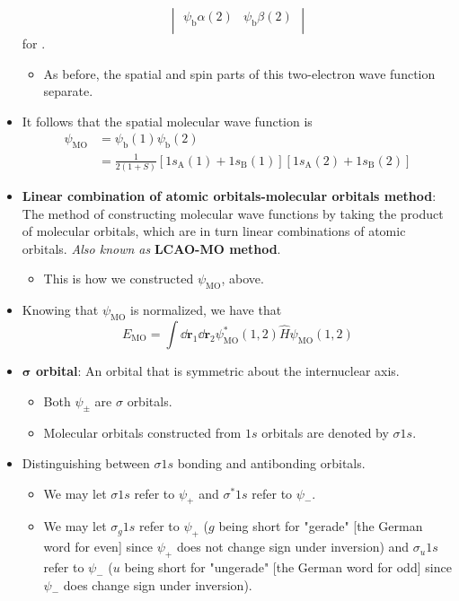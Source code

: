 \documentclass[../notes.tex]{subfiles}
\begin{document}
\begin{itemize}
\begin{equation*}
\begin{vmatrix}
            \psi_\text{b}\alpha(2) & \psi_\text{b}\beta(2)\\
        \end{vmatrix}
    \end{equation*}
    for .
    \begin{itemize}
        \item As before, the spatial and spin parts of this two-electron wave function separate.
    \end{itemize}
    \item It follows that the spatial molecular wave function is
    \begin{align*}
        \psi_\text{MO} &= \psi_\text{b}(1)\psi_\text{b}(2)\\
        &= \frac{1}{2(1+S)}[1s_\text{A}(1)+1s_\text{B}(1)][1s_\text{A}(2)+1s_\text{B}(2)]
    \end{align*}
    \item \textbf{Linear combination of atomic orbitals-molecular orbitals method}: The method of constructing molecular wave functions by taking the product of molecular orbitals, which are in turn linear combinations of atomic orbitals. \emph{Also known as} \textbf{LCAO-MO method}.
    \begin{itemize}
        \item This is how we constructed $\psi_\text{MO}$, above.
    \end{itemize}
    \item Knowing that $\psi_\text{MO}$ is normalized, we have that
    \begin{equation*}
        E_\text{MO} = \int\dd{\mathbf{r}_1}\dd{\mathbf{r}_2}\psi_\text{MO}^*(1,2)\hat{H}\psi_\text{MO}(1,2)
    \end{equation*}
    \item \textbf{$\bm{\sigma}$ orbital}: An orbital that is symmetric about the internuclear axis.
    \begin{itemize}
        \item Both $\psi_\pm$ are $\sigma$ orbitals.
        \item Molecular orbitals constructed from $1s$ orbitals are denoted by $\sigma 1s$.
    \end{itemize}
    \item Distinguishing between $\sigma 1s$ bonding and antibonding orbitals.
    \begin{itemize}
        \item We may let $\sigma 1s$ refer to $\psi_+$ and $\sigma^*1s$ refer to $\psi_-$.
        \item We may let $\sigma_g1s$ refer to $\psi_+$ ($g$ being short for "gerade" [the German word for even] since $\psi_+$ does not change sign under inversion) and $\sigma_u1s$ refer to $\psi_-$ ($u$ being short for "ungerade" [the German word for odd] since $\psi_-$ does change sign under inversion).

\end{itemize}
\end{itemize}
\end{document}
